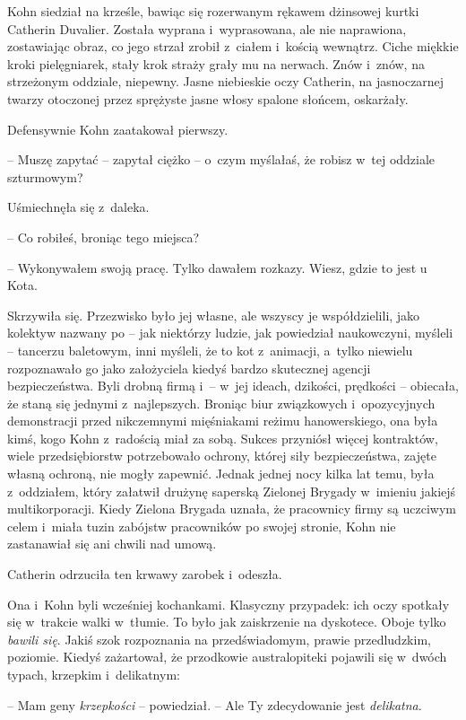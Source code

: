 \documentclass[oneside,polish,11pt,sfheadings]{mwbk}
\begin{document}
Kohn siedział na krześle, bawiąc się rozerwanym rękawem dżinsowej kurtki
Catherin Duvalier. Została wyprana i~wyprasowana, ale nie naprawiona,
zostawiając obraz, co jego strzał zrobił z~ciałem i~kością wewnątrz.
Ciche miękkie kroki pielęgniarek, stały krok straży grały mu na nerwach.
Znów i~znów, na strzeżonym oddziale, niepewny. Jasne niebieskie oczy
Catherin, na jasnoczarnej twarzy otoczonej przez sprężyste jasne włosy
spalone słońcem, oskarżały.

Defensywnie Kohn zaatakował pierwszy.

-- Muszę zapytać -- zapytał ciężko -- o~czym myślałaś, że robisz w~tej
oddziale szturmowym?

Uśmiechnęła się z~daleka. 

-- Co robiłeś, broniąc tego miejsca?

-- Wykonywałem swoją pracę. Tylko dawałem rozkazy. Wiesz, gdzie to jest u
Kota.

Skrzywiła się. Przezwisko było jej własne, ale wszyscy je współdzielili,
jako kolektyw nazwany po -- jak niektórzy ludzie, jak powiedział
naukowczyni, myśleli -- tancerzu baletowym, inni myśleli, że to kot z~animacji, a~tylko niewielu rozpoznawało go jako założyciela kiedyś
bardzo skutecznej agencji bezpieczeństwa. Byli drobną firmą i~-- w~jej
ideach, dzikości, prędkości -- obiecała, że staną się jednymi z~najlepszych. Broniąc biur związkowych i~opozycyjnych demonstracji przed
nikczemnymi mięśniakami reżimu hanowerskiego, ona była kimś, kogo Kohn z~radością miał za sobą. Sukces przyniósł więcej kontraktów, wiele
przedsiębiorstw potrzebowało ochrony, której siły bezpieczeństwa, zajęte
własną ochroną, nie mogły zapewnić. Jednak jednej nocy kilka lat temu,
była z~oddziałem, który załatwił drużynę saperską Zielonej Brygady w~imieniu jakiejś multikorporacji. Kiedy Zielona Brygada uznała, że
pracownicy firmy są uczciwym celem i~miała tuzin zabójstw pracowników po
swojej stronie, Kohn nie zastanawiał się ani chwili nad umową.

Catherin odrzuciła ten krwawy zarobek i~odeszła.

Ona i~Kohn byli wcześniej kochankami. Klasyczny przypadek: ich oczy
spotkały się w~trakcie walki w~tłumie. To było jak zaiskrzenie na
dyskotece. Oboje tylko \emph{bawili się}. Jakiś szok rozpoznania na
przedświadomym, prawie przedludzkim, poziomie. Kiedyś zażartował, że
przodkowie australopiteki pojawili się w~dwóch typach, krzepkim i~delikatnym: 

-- Mam geny \emph{krzepkości} -- powiedział. -- Ale Ty
zdecydowanie jest \emph{delikatna}. 
\end{document}
